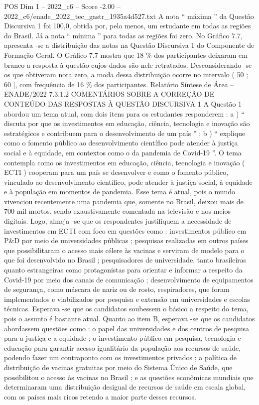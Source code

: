\begin{textsample}{POS Dim 1 – 2022\_c6 – Score -2.00 – 2022\_c6/enade\_2022\_tec\_gastr\_1935a4d527.txt}
A nota “ máxima ” da Questão Discursiva 1 foi 100,0, obtida por, pelo menos, um estudante em todas as regiões do Brasil.
Já a nota “ mínima ” para todas as regiões foi zero.
No Gráfico 7.7, apresenta -se a distribuição das notas na Questão Discursiva 1 do Componente de Formação Geral.
O Gráfico 7.7 mostra que 18 \% dos participantes deixaram em branco a resposta à questão cujos dados são nele retratados.
Desconsiderando -se os que obtiveram nota zero, a moda dessa distribuição ocorre no intervalo ( 50 ; 60 ], com frequência de 16 \% dos participantes.
Relatório Síntese de Área – ENADE/2022 7.3.1.2 COMENTÁRIOS SOBRE A CORREÇÃO DE CONTEÚDO DAS RESPOSTAS À QUESTÃO DISCURSIVA 1 A Questão 1 abordou um tema atual, com dois itens para os estudantes responderem : a ) “ discuta por que os investimentos em educação, ciência, tecnologia e inovação são estratégicos e contribuem para o desenvolvimento de um país ” ; b ) “ explique como o fomento público ao desenvolvimento científico pode atender à justiça social e à equidade, em contextos como o da pandemia de Covid-19 ”.
O tema contempla como os investimentos em educação, ciência, tecnologia e inovação ( ECTI ) cooperam para um país se desenvolver e como o fomento público, vinculado ao desenvolvimento científico, pode atender à justiça social, à equidade e à população em momentos de pandemia.
Esse tema é atual, pois o mundo vivenciou recentemente uma pandemia que, somente no Brasil, deixou mais de 700 mil mortos, sendo exaustivamente comentada na televisão e nos meios digitais.
Logo, almeja -se que os respondentes justifiquem a necessidade de investimentos em ECTI com foco em questões como : investimentos público em P\&D por meio de universidades públicas ; pesquisas realizadas em outros países que possibilitaram o acesso mais célere às vacinas e serviram de modelo para o que foi desenvolvido no Brasil ; pesquisadores de universidade, tanto brasileiras quanto estrangeiras como protagonistas para orientar e informar a respeito da Covid-19 por meio dos canais de comunicação ; desenvolvimento de equipamentos de segurança, como máscara de nariz ou de rosto, respiradores, que foram implementados e viabilizados por pesquisa e extensão em universidades e escolas técnicas.
Esperava -se que os candidatos soubessem o básico a respeito do tema, pois o assunto é bastante atual.
Quanto ao item B, esperava -se que os candidatos abordassem questões como : o papel das universidades e dos centros de pesquisa para a justiça e a equidade ; o investimento público em pesquisa, tecnologia e educação para garantir acesso igualitário da população aos recursos de saúde, podendo fazer um contraponto com os investimentos privados ; a política de distribuição de vacinas gratuitas por meio do Sistema Único de Saúde, que possibilitou o acesso às vacinas no Brasil ; e as questões econômicas mundiais que determinaram uma distribuição desigual de recursos de saúde em escala global, com os países mais ricos retendo a maior parte desses recursos.

\end{textsample}
